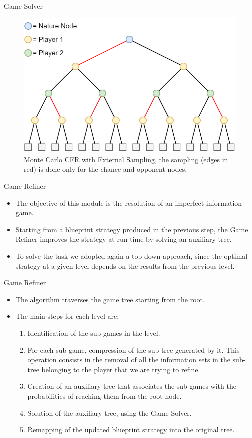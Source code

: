 \documentclass[11pt]{beamer}
\begin{document}
\begin{frame}{Game Solver}
\begin{figure}[hbtp]
		\centering
		\includegraphics[scale=0.3]{images/img_05.png}
		\caption{Monte Carlo CFR with External Sampling, the sampling (edges in red) is done only for the chance and opponent nodes.}
\end{figure}
\end{frame}

\begin{frame}{Game Refiner}
\begin{itemize}
\item The objective of this module is the resolution of an imperfect information game. 
\item Starting from a blueprint strategy produced in the previous step, the Game Refiner improves the strategy at run time by solving an auxiliary tree.
\item To solve the task we adopted again a top down approach, since the optimal strategy at a given level depends on the results from the previous level.
\end{itemize}
\end{frame}

\begin{frame}{Game Refiner}
\begin{itemize}
\item The algorithm traverses the game tree starting from the root. 
\item The main steps for each level are:
\begin{enumerate}
\item Identification of the sub-games in the level.
\item For each sub-game, compression of the sub-tree generated by it. This operation consists in the removal of all the information sets in the sub-tree belonging to the player that we are trying to refine.
\item Creation of an auxiliary tree that associates the sub-games with the probabilities of reaching them from the root node.
\item Solution of the auxiliary tree, using the Game Solver.
\item Remapping of the updated blueprint strategy into the original tree.
\end{enumerate}
\end{itemize}
\end{frame}
\end{document}
